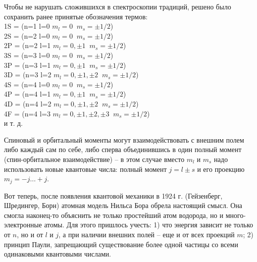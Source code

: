 Чтобы не нарушать сложившихся в спектроскопии традиций, решено было сохранить ранее принятые обозначения термов:\\
1S = (n=1 l=0 $m_l=0 \;\;m_s=\pm1/2$)\\
2S = (n=2 l=0 $m_l=0 \;\;m_s=\pm1/2$)\\
2P = (n=2 l=1 $m_l=0,\pm1 \;\;m_s=\pm1/2$)\\
3S = (n=3 l=0 $m_l=0 \;\;m_s=\pm1/2$)\\
3P = (n=3 l=1 $m_l=0,\pm1 \;\;m_s=\pm1/2$)\\
3D = (n=3 l=2 $m_l=0,\pm1,\pm2 \;\;m_s=\pm1/2$)\\
4S = (n=4 l=0 $m_l=0 \;\;m_s=\pm1/2$)\\
4P = (n=4 l=1 $m_l=0,\pm1 \;\;m_s=\pm1/2$)\\
4D = (n=4 l=2 $m_l=0,\pm1,\pm2 \;\;m_s=\pm1/2$)\\
4F = (n=4 l=3 $m_l=0,\pm1,\pm2,\pm3 \;\;m_s=\pm1/2$)\\
и т. д.

Спиновый и орбитальный моменты могут взаимодействовать с внешним полем либо каждый сам по себе, либо сперва объединившись в один полный момент (спин-орбитальное взаимодействие) -- в этом случае вместо $m_l$ и $m_s$ надо использовать новые квантовые числа: полный момент $j=l\pm s$ и его проекцию $m_j=-j\ldots+j$.

Вот теперь, после появления квантовой механики в 1924 г. (Гейзенберг, Шредингер, Борн) атомная модель Нильса Бора обрела настоящий смысл. Она смогла наконец-то объяснить не только простейший атом водорода, но и много-электронные атомы. Для этого пришлось учесть: 1) что энергия зависит не только от $n$, но и от $l$ и $j$, а при наличии внешних полей -- еще и от всех проекций $m$; 2) принцип Паули, запрещающий существование более одной частицы со всеми одинаковыми квантовыми числами.

